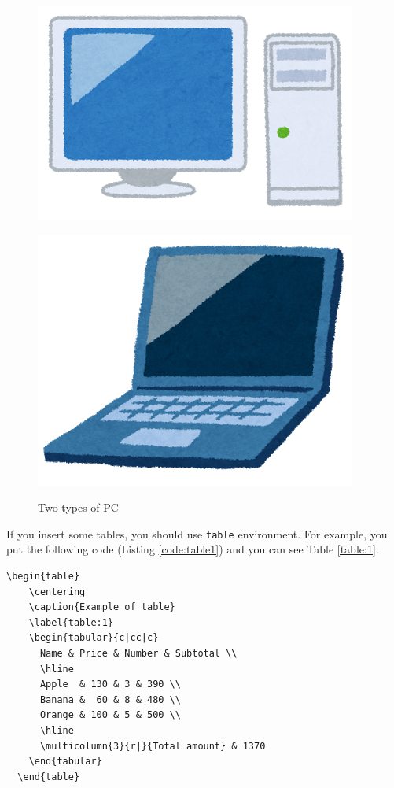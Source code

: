 \begin{figure}[htbp]
  \begin{minipage}{0.48\hsize}
    \centering
    \includegraphics[scale=0.4]{./Figure/kaden_PC.png}
    \label{fig:desktop}
  \end{minipage}
  \hfill
  \begin{minipage}{0.48\hsize}
    \centering
    \includegraphics[scale=0.4]{./Figure/kaden_laptop.png}
    \label{fig:laptop}
  \end{minipage}
  \caption{Two types of PC}
  \label{fig:pc}
\end{figure}

If you insert some tables, you should use \texttt{table} environment. For example, you put the following code (Listing \ref{code:table1}) and you can see Table \ref{table:1}. 

\begin{lstlisting}[caption=Example of Table 1, label=code:table1]
  \begin{table}
    \centering
    \caption{Example of table}
    \label{table:1}
    \begin{tabular}{c|cc|c}
      Name & Price & Number & Subtotal \\
      \hline
      Apple  & 130 & 3 & 390 \\
      Banana &  60 & 8 & 480 \\
      Orange & 100 & 5 & 500 \\
      \hline
      \multicolumn{3}{r|}{Total amount} & 1370
    \end{tabular}
  \end{table}
\end{lstlisting}

